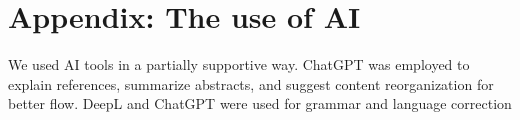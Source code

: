 \section{Appendix: The use of AI}
We used AI tools in a partially supportive way. ChatGPT was employed to explain references, summarize abstracts, and suggest content reorganization for better flow. DeepL and ChatGPT were used for grammar and language correction